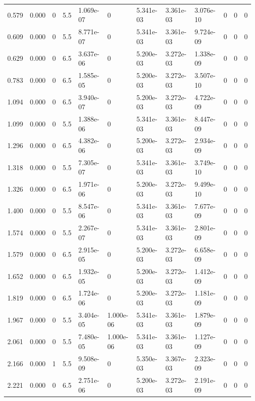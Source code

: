 \documentclass[preview]{standalone}
\begin{document}
{{\begin{tabular}{L{1.2cm}C{1.2cm} C{0.3cm}C{0.5cm} C{1.4cm}C{1.4cm} C{1.4cm}C{1.4cm} C{1.6cm}C{1.6cm} C{1.6cm}C{1.6cm}}
  0.579  &  0.000  & 0     & 5.5 &  1.069e-07  & 0  &  5.341e-03&   3.361e-03& 3.076e-10 & 0   &  0 & 0  \\ 
  0.609  &  0.000  & 0     & 5.5 &  8.771e-07  & 0  &  5.341e-03&   3.361e-03& 9.724e-09 & 0   &  0 & 0  \\ 
  0.629  &  0.000  & 0     & 6.5 &  3.637e-06  & 0  &  5.200e-03&   3.272e-03& 1.338e-09 & 0   &  0 & 0  \\ 
  0.783  &  0.000  & 0     & 6.5 &  1.585e-05  & 0  &  5.200e-03&   3.272e-03& 3.507e-10 & 0   &  0 & 0  \\ 
  1.094  &  0.000  & 0     & 6.5 &  3.940e-07  & 0  &  5.200e-03&   3.272e-03& 4.722e-09 & 0   &  0 & 0  \\ 
  1.099  &  0.000  & 0     & 5.5 &  1.388e-06  & 0  &  5.341e-03&   3.361e-03& 8.447e-09 & 0   &  0 & 0  \\ 
  1.296  &  0.000  & 0     & 6.5 &  4.382e-06  & 0  &  5.200e-03&   3.272e-03& 2.934e-09 & 0   &  0 & 0  \\ 
  1.318  &  0.000  & 0     & 5.5 &  7.305e-07  & 0  &  5.341e-03&   3.361e-03& 3.749e-10 & 0   &  0 & 0  \\ 
  1.326  &  0.000  & 0     & 6.5 &  1.971e-06  & 0  &  5.200e-03&   3.272e-03& 9.499e-10 & 0   &  0 & 0  \\ 
  1.400  &  0.000  & 0     & 5.5 &  8.547e-06  & 0  &  5.341e-03&   3.361e-03& 7.677e-09 & 0   &  0 & 0  \\ 
  1.574  &  0.000  & 0     & 5.5 &  2.267e-07  & 0  &  5.341e-03&   3.361e-03& 2.801e-09 & 0   &  0 & 0  \\ 
  1.579  &  0.000  & 0     & 6.5 &  2.915e-05  & 0  &  5.200e-03&   3.272e-03& 6.658e-09 & 0   &  0 & 0  \\ 
  1.652  &  0.000  & 0     & 6.5 &  1.932e-05  & 0  &  5.200e-03&   3.272e-03& 1.412e-09 & 0   &  0 & 0  \\ 
  1.819  &  0.000  & 0     & 6.5 &  1.724e-06  & 0  &  5.200e-03&   3.272e-03& 1.181e-09 & 0   &  0 & 0  \\ 
  1.967  &  0.000  & 0     & 5.5 &  3.404e-05  & 1.000e-06  &  5.341e-03&   3.361e-03& 1.879e-09 & 0   &  0 & 0  \\ 
  2.061  &  0.000  & 0     & 5.5 &  7.480e-05  & 1.000e-06  &  5.341e-03&   3.361e-03& 1.127e-09 & 0   &  0 & 0  \\ 
  2.166  &  0.000  & 1     & 5.5 &  9.508e-09  & 0  &  5.350e-03&   3.367e-03& 2.323e-09 & 0   &  0 & 0  \\ 
  2.221  &  0.000  & 0     & 6.5 &  2.751e-06  & 0  &  5.200e-03&   3.272e-03& 2.191e-09 & 0   &  0 & 0  \\ 

\end{tabular}}}
\end{document}
